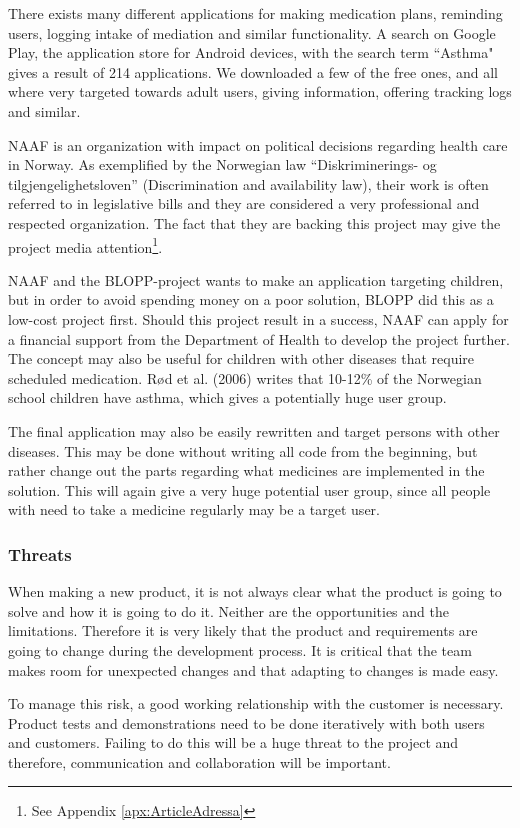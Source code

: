 There exists many different applications for making medication plans, reminding 
users, logging intake of mediation and similar functionality. A search on Google Play, 
the application store for Android devices, with the search term ``Asthma" gives a result of 214 
applications. We downloaded a few of the free ones, and all where very targeted towards 
adult users, giving information, offering tracking logs and similar. 

NAAF is an organization with impact on political decisions regarding health care in 
Norway. As exemplified by the Norwegian law ``Diskriminerings- og 
tilgjengelighetsloven''\cite{diskrimineringsloven} (Discrimination and availability law), 
their work is often referred to in legislative bills and they are considered a very 
professional and respected organization. The fact that they are backing this project may 
give the project media attention\footnote{See Appendix \ref{apx:ArticleAdressa}}.

NAAF and the BLOPP-project wants to make an application targeting children, but in order 
to avoid spending money on a poor solution, BLOPP did this as a low-cost project 
first. Should this project result in a success, NAAF can apply for a financial support 
from the Department of Health to develop the project further. The concept may also be 
useful for children with other diseases that require scheduled medication. R{\o}d et al. 
(2006)\cite{helsebibastma} writes that 10-12\% of the Norwegian school children have asthma, 
which gives a potentially huge user group. 

The final application may also be easily rewritten and target persons with other 
diseases. This may be done without writing all code from the beginning, but rather 
change out the parts regarding what medicines are implemented in the solution. This will 
again give a very huge potential user group, since all people with need to take a 
medicine regularly may be a target user.

\subsubsection{Threats}
When making a new product, it is not always clear what the product is going to solve and 
how it is going to do it. Neither are the opportunities and the limitations. Therefore 
it is very likely that the product and requirements are going to change during the 
development process. It is critical that the team makes room for unexpected changes and 
that adapting to changes is made easy. 

To manage this risk, a good working relationship with the customer is necessary. Product tests 
and demonstrations need to be done iteratively with both users and customers. Failing to 
do this will be a huge threat to the project and therefore, communication and 
collaboration will be important. 